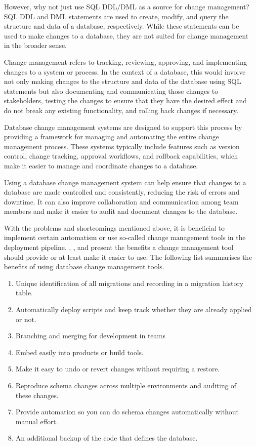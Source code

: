 %
However, why not just use SQL \gls{DDL}/\gls{DML} as a source for change management? SQL DDL and DML statements are used to create, modify, and query the structure and data of a database, respectively. While these statements can be used to make changes to a database, they are not suited for change management in the broader sense.

Change management refers to tracking, reviewing, approving, and implementing changes to a system or process. In the context of a database, this would involve not only making changes to the structure and data of the database using SQL statements but also documenting and communicating those changes to stakeholders, testing the changes to ensure that they have the desired effect and do not break any existing functionality, and rolling back changes if necessary.

Database change management systems are designed to support this process by providing a framework for managing and automating the entire change management process. These systems typically include features such as version control, change tracking, approval workflows, and rollback capabilities, which make it easier to manage and coordinate changes to a database.

Using a database change management system can help ensure that changes to a database are made controlled and consistently, reducing the risk of errors and downtime. It can also improve collaboration and communication among team members and make it easier to audit and document changes to the database.
 
%
With the problems and shortcomings mentioned above, it is beneficial to implement certain automatism or use so-called change management tools in the deployment pipeline.
\cite{Dillon2022}, \cite{Robles2021}, and \cite{Fritchey2022} present the benefits a change management tool should provide or at least make it easier to use. The following list summarises the benefits of using database change management tools.

\begin{enumerate}
	\item Unique identification of all migrations and recording in a migration history table.
    \item Automatically deploy scripts and keep track whether they are already applied or not.
    \item Branching and merging for development in teams
    \item Embed easily into products or build tools.
    \item Make it easy to undo or revert changes without requiring a restore.
    \item Reproduce schema changes across multiple environments and auditing of these changes.
    \item Provide automation so you can do schema changes automatically without manual effort.
    \item An additional backup of the code that defines the database.
\end{enumerate}


